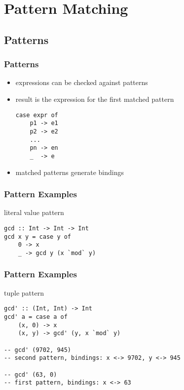 \documentclass[dvipsnames]{beamer}
\theoremstyle{plain}
\begin{document}
\section{Pattern Matching}

\subsection{Patterns}

\begin{frame}[fragile]
  \frametitle{Patterns}

  \begin{itemize}
    \item expressions can be checked against patterns
    \item result is the expression for the first matched pattern
    \begin{lstlisting}[style=syntax]
case expr of
    p1 -> e1
    p2 -> e2
    ...
    pn -> en
    _  -> e
    \end{lstlisting}
    \item matched patterns generate bindings
  \end{itemize}
\end{frame}

\begin{frame}[fragile]
  \frametitle{Pattern Examples}

  \begin{exampleblock}{literal value pattern}
    \begin{lstlisting}
gcd :: Int -> Int -> Int
gcd x y = case y of
    0 -> x
    _ -> gcd y (x `mod` y)
    \end{lstlisting}
  \end{exampleblock}
\end{frame}

\begin{frame}[fragile]
  \frametitle{Pattern Examples}

  \begin{exampleblock}{tuple pattern}
    \begin{lstlisting}
gcd' :: (Int, Int) -> Int
gcd' a = case a of
    (x, 0) -> x
    (x, y) -> gcd' (y, x `mod` y)

-- gcd' (9702, 945)
-- second pattern, bindings: x <-> 9702, y <-> 945

-- gcd' (63, 0)
-- first pattern, bindings: x <-> 63
    \end{lstlisting}
  \end{exampleblock}
\end{frame}
\end{document}
